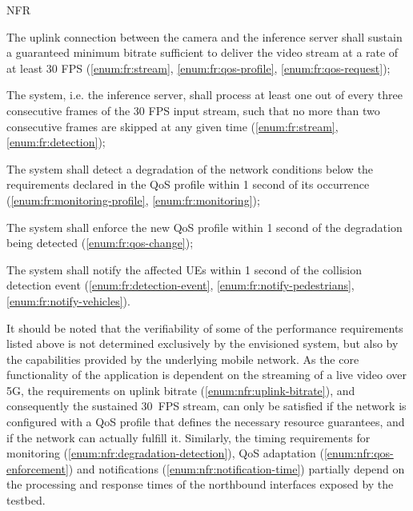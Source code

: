 \begin{custenumerate}{NFR}
    \item \label{enum:nfr:uplink-bitrate} The uplink connection between the camera and the inference server shall sustain a guaranteed minimum bitrate sufficient to deliver the video stream at a rate of at least 30 \acs{FPS} (\ref{enum:fr:stream}, \ref{enum:fr:qos-profile}, \ref{enum:fr:qos-request});
    \item \label{enum:nfr:frame-processing} The system, i.e. the inference server, shall process at least one out of every three consecutive frames of the 30 \acs{FPS} input stream, such that no more than two consecutive frames are skipped at any given time (\ref{enum:fr:stream}, \ref{enum:fr:detection});
    \item \label{enum:nfr:degradation-detection} The system shall detect a degradation of the network conditions below the requirements declared in the \acs{QoS} profile within 1 second of its occurrence (\ref{enum:fr:monitoring-profile}, \ref{enum:fr:monitoring});
    \item \label{enum:nfr:qos-enforcement} The system shall enforce the new \acs{QoS} profile within 1 second of the degradation being detected (\ref{enum:fr:qos-change});
    \item \label{enum:nfr:notification-time} The system shall notify the affected \acsp{UE} within 1 second of the collision detection event (\ref{enum:fr:detection-event}, \ref{enum:fr:notify-pedestrians}, \ref{enum:fr:notify-vehicles}).
\end{custenumerate}

It should be noted that the verifiability of some of the performance requirements listed above is not determined exclusively by the envisioned system, but also by the capabilities provided by the underlying mobile network. As the core functionality of the application is dependent on the streaming of a live video over \acs{5G}, the requirements on uplink bitrate (\ref{enum:nfr:uplink-bitrate}), and consequently the sustained 30~\acs{FPS} stream, can only be satisfied if the network is configured with a \acs{QoS} profile that defines the necessary resource guarantees, and if the network can actually fulfill it. Similarly, the timing requirements for monitoring (\ref{enum:nfr:degradation-detection}), \acs{QoS} adaptation (\ref{enum:nfr:qos-enforcement}) and notifications (\ref{enum:nfr:notification-time}) partially depend on the processing and response times of the northbound interfaces exposed by the testbed.

